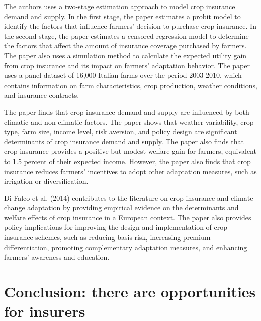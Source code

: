 \documentclass[a4paper,12pt]{article}
\begin{document}
The authors uses a two-stage estimation approach to model crop insurance demand and supply. In the first stage, the paper estimates a probit model to identify the factors that influence farmers’ decision to purchase crop insurance. In the second stage, the paper estimates a censored regression model to determine the factors that affect the amount of insurance coverage purchased by farmers. The paper also uses a simulation method to calculate the expected utility gain from crop insurance and its impact on farmers’ adaptation behavior. The paper uses a panel dataset of 16,000 Italian farms over the period 2003-2010, which contains information on farm characteristics, crop production, weather conditions, and insurance contracts.

The paper finds that crop insurance demand and supply are influenced by both climatic and non-climatic factors. The paper shows that weather variability, crop type, farm size, income level, risk aversion, and policy design are significant determinants of crop insurance demand and supply. The paper also finds that crop insurance provides a positive but modest welfare gain for farmers, equivalent to 1.5 percent of their expected income. However, the paper also finds that crop insurance reduces farmers’ incentives to adopt other adaptation measures, such as irrigation or diversification.

Di Falco et al. (2014) contributes to the literature on crop insurance and climate change adaptation by providing empirical evidence on the determinants and welfare effects of crop insurance in a European context. The paper also provides policy implications for improving the design and implementation of crop insurance schemes, such as reducing basis risk, increasing premium differentiation, promoting complementary adaptation measures, and enhancing farmers’ awareness and education.

\section{Conclusion: there are opportunities for insurers}
\end{document}

